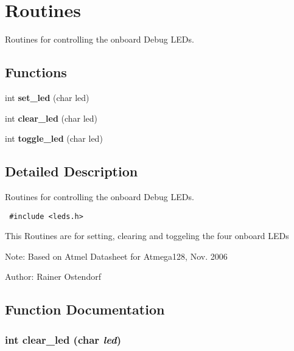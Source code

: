 \section{Routines}
\label{group__LED}
Routines for controlling the onboard Debug LEDs.  
\subsection*{Functions}
\begin{CompactItemize}
\item 
int {\bf set\_\-led} (char led)
\item 
int {\bf clear\_\-led} (char led)
\item 
int {\bf toggle\_\-led} (char led)
\end{CompactItemize}


\subsection{Detailed Description}
Routines for controlling the onboard Debug LEDs. 



\begin{Code}\begin{verbatim} #include <leds.h> 
\end{verbatim}\end{Code}



This Routines are for setting, clearing and toggeling the four onboard LEDs

\begin{Desc}
\item[Note:]Based on Atmel Datasheet for Atmega128, Nov. 2006 \end{Desc}
\begin{Desc}
\item[Author:]Rainer Ostendorf \end{Desc}


\subsection{Function Documentation}
\subsubsection{\setlength{\rightskip}{0pt plus 5cm}int clear\_\-led (char {\em led})}\label{group__LED_ga07cffc8acf23fbbc1dab7a3d86f7fc7}


